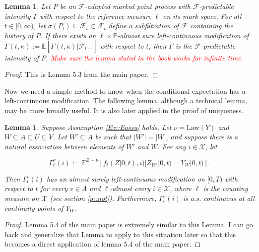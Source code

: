 \documentclass[12pt]{article}
\newcommand{\mb}{\mathbb}
\newcommand{\mc}{\mathcal}
\newcommand{\te}{\text}
\newcommand{\tr}{\textcolor{red}}
\newcommand{\pr}{\mb{P}}							%
\newcommand{\ex}[1]{\mb{E}\left[#1\right]}			%
\newcommand{\exmu}[2]{\mb{E}^{#1}\left[#2\right]}	%
\newcommand{\defeq}{:=}								%
\newcommand{\sta}{\mc{X}}							%
\newcommand{\Sm}{\ell}								%
\newcommand{\F}{\mc{F}}								%
\newcommand{\vind}[1]{_{#1}}						%
\newcommand{\tmi}[1]{#1}							%
\newcommand{\vpara}[1]{^{#1}}						%
\newcommand{\tpara}[1]{_{#1}}						%
\newcommand{\Xg}{Y}									%
\newcommand{\alt}[1]{\tilde{#1}}					%
\renewcommand{\mark}{\kappa}						%
\newcommand{\ratee}{\Gamma}							%
\newcommand{\cratee}{\alt{\ratee}}					%
\newcommand{\rp}{P}									%
\newcommand{\mm}{\nu}								%
\newcommand{\law}{\te{Law}}							%
\newcommand{\Xh}{Z}									%
\newtheorem{lem}[thms]{Lemma}
\begin{document}
\begin{lem}
Let \(\rp\) be an \(\F\)-adapted marked point process with \(\F\)-predictable intensity \(\ratee\) with respect to the reference measure \(\Sm\) on its mark space. For all \(t \in [0,\infty)\), let \(\sigma(\rp_{t}) \subseteq \alt{\F}_{t}\subset \F_{t}\) define a subfiltration of \(\F\) containing the history of \(\rp\). If there exists an \(\ell\times \pr\)-almost sure left-continuous modification of \(\cratee(t,\mark) := \ex{\ratee(t,\mark)|\alt{\F}_{t-}}\) with respect to \(t\), then \(\cratee\) is the \(\alt{\F}\)-predictable intensity of \(\rp\). \tr{Make sure the lemma stated in the book works for infinite time.}
\label{Ex::filtering}
\end{lem}

\begin{proof}
This is Lemma 5.3 from the main paper.
\end{proof}

Now we need a simple method to know when the conditional expectation has a left-continuous modification. The following lemma, although a technical lemma, may be more broadly useful. It is also later applied in the proof of uniqueness.


\begin{lem}
Suppose Assumption \ref{Ex::Eassu} holds. Let \(\mm = \law(\Xg)\) and \(W\subseteq A \subseteq U\subseteq V\). Let \(W'\subseteq A\) be such that \(|W'| = |W|\), and suppose there is a natural association between elements of \(W'\) and \(W\). For any \(i \in \sta\), let

\[\ratee\vpara{v}\tpara{t}(i) \defeq \exmu{\Xh\sim \mm}{f_t(\Xh\tmi{[0,t)},i)|\Xh\vind{W'}\tmi{[0,t)} = \Xg\vind{W}\tmi{[0,t)}}.\]

Then \(\ratee\vpara{v}\tpara{t}(i)\) has an almost surely left-continuous modification on \([0,T)\) with respect to \(t\) for every \(v \in A\) and \(\ell\)-almost every \(i \in \sta\), where \(\ell\) is the counting measure on \(\sta\) (see section \ref{p::not}). Furthermore, \(\ratee\vpara{v}\tpara{t}(i)\) is a.s. continuous at all continuity points of \(\Xg\vind{W}\).
\label{Ex::leftmod}
\end{lem}
\begin{proof}
Lemma 5.4 of the main paper is extremely similar to this Lemma. I can go back and generalize that Lemma to apply to this situation later so that this becomes a direct application of lemma 5.4 of the main paper.
\end{proof}
\end{document}
